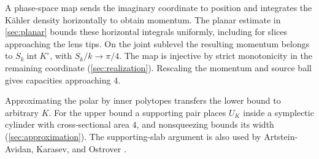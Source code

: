 A phase-space map sends the imaginary coordinate to position and integrates the K\"ahler density horizontally to obtain momentum. The planar estimate in \cref{sec:planar} bounds these horizontal integrals uniformly, including for slices approaching the lens tips. On the joint sublevel the resulting momentum belongs to $S_k\operatorname{int}K^\circ$, with $S_k/k\to\pi/4$. The map is injective by strict monotonicity in the remaining coordinate (\cref{sec:realization}). Rescaling the momentum and source ball gives capacities approaching $4$.

Approximating the polar by inner polytopes transfers the lower bound to arbitrary $K$. For the upper bound a supporting pair places $U_K$ inside a symplectic cylinder with cross-sectional area $4$, and nonsqueezing bounds its width (\cref{sec:approximation}). The supporting-slab argument is also used by Artstein-Avidan, Karasev, and Ostrover \cite[Remark~4.2]{AAKO2014}.
